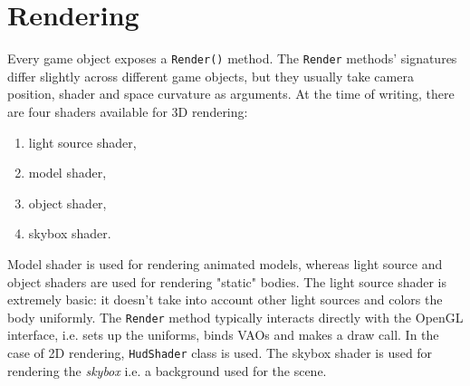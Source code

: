\section{Rendering}\label{sec:implementation_rendering}
Every game object exposes a \texttt{Render()} method.
The \texttt{Render} methods' signatures differ slightly across different game objects, but they usually take camera position, shader and space curvature as arguments.
At the time of writing, there are four shaders available for 3D rendering:
\begin{enumerate}
    \item light source shader,
    \item model shader,
    \item object shader,
    \item skybox shader.
\end{enumerate}
Model shader is used for rendering animated models, whereas light source and object shaders are used for rendering "static" bodies.
The light source shader is extremely basic: it doesn't take into account other light sources and colors the body uniformly.
The \texttt{Render} method typically interacts directly with the OpenGL interface, i.e. sets up the uniforms, binds VAOs and makes a draw call.
In the case of 2D rendering, \texttt{HudShader} class is used.
The skybox shader is used for rendering the \textit{skybox} i.e. a background used for the scene.
